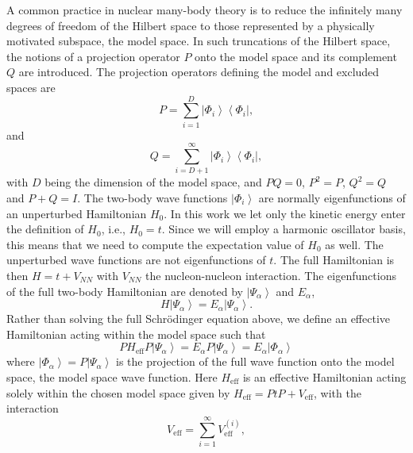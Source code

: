 \documentclass[aps,prc,twocolumn,floatfix]{revtex4}
\begin{document}
A common practice in nuclear many-body theory is to reduce the infinitely
many degrees of freedom of the Hilbert space to those represented
by a physically motivated subspace, the model space.
In such truncations of the Hilbert space, the notions of a projection
operator $P$ onto the model space and its complement $Q$ are
introduced. The projection operators defining the model and excluded
spaces are
\begin{equation}
        P=\sum_{i=1}^{D} \left|\Phi_i\right\rangle
        \left\langle\Phi_i\right |,
\label{eq:poperator}
\end{equation}
and
\begin{equation}
        Q=\sum_{i=D+1}^{\infty} \left|\Phi_i\right\rangle
        \left\langle\Phi_i\right |,
\label{eq:qoperator}
\end{equation}
with $D$ being the dimension of the model space, and $PQ=0$, $P^2 =P$,
$Q^2 =Q$ and $P+Q=I$. The two-body wave functions $\left|\Phi_i\right\rangle$ 
are normally eigenfunctions
of an unperturbed Hamiltonian $H_0$. In this work we let only the kinetic energy
enter the definition of $H_0$, i.e., $H_0=t$. 
Since we will employ a harmonic oscillator basis, this means that 
we need to  compute  the expectation value of $H_0$ as well. The unperturbed wave functions are not eigenfunctions of $t$. 
The full Hamiltonian
is then $H=t+V_{NN}$ with $V_{NN}$ the
nucleon-nucleon interaction.
The eigenfunctions of the full two-body Hamiltonian are denoted by
$\left|\Psi_{\alpha}\right\rangle$
and $E_{\alpha}$,
\begin{equation}
                H\left|\Psi_{\alpha}\right\rangle= 
                E_{\alpha}\left|\Psi_{\alpha}\right\rangle.
\end{equation}
Rather than solving the full Schr\"{o}dinger equation above, we define
an effective Hamiltonian acting within the model space such
that
\begin{equation}
               PH_{\mathrm{eff}}P\left|\Psi_{\alpha}\right\rangle=
               E_{\alpha}P\left|\Psi_{\alpha}\right\rangle=
              E_{\alpha}\left|\Phi_{\alpha}\right\rangle
\end{equation}
where $\left|\Phi_{\alpha}\right\rangle=P\left|\Psi_{\alpha}\right\rangle$
is the projection of the full wave function
onto the model space, the model space wave function.
Here $H_{\mathrm{eff}}$  is an effective Hamiltonian acting solely
within the chosen model space
given by $H_{\mathrm{eff}}=PtP+V_{\mathrm{eff}}$, with the interaction
\begin{equation}
  V_{\mathrm{eff}}=\sum_{i=1}^{\infty} V_{\mathrm{eff}}^{(i)},
\end{equation}
\end{document}
